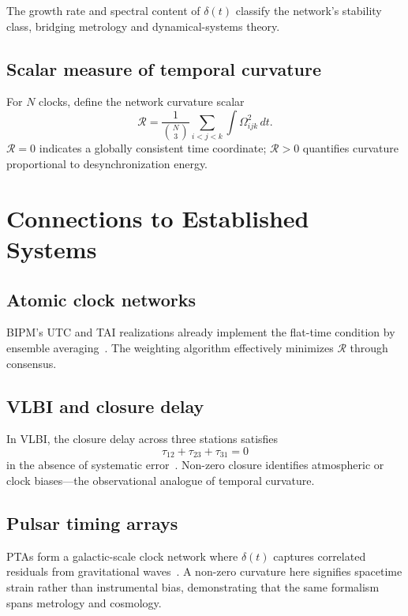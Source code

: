 \documentclass[11pt,a4paper]{article}
\begin{document}
The growth rate and spectral content of $\delta(t)$ classify the network's stability class, bridging metrology and dynamical-systems theory.

\subsection{Scalar measure of temporal curvature}
For $N$ clocks, define the network curvature scalar
\begin{equation}
\mathcal{R} = 
\frac{1}{\binom{N}{3}}
\sum_{i<j<k} 
\int \Omega_{ijk}^2 \, dt.
\end{equation}
$\mathcal{R}=0$ indicates a globally consistent time coordinate; $\mathcal{R}>0$ quantifies curvature proportional to desynchronization energy.

\section{Connections to Established Systems}

\subsection{Atomic clock networks}
BIPM's UTC and TAI realizations already implement the flat-time condition by ensemble averaging~\citep{Petit2014}. 
The weighting algorithm effectively minimizes $\mathcal{R}$ through consensus.

\subsection{VLBI and closure delay}
In VLBI, the closure delay across three stations satisfies
\begin{equation}
\tau_{12} + \tau_{23} + \tau_{31} = 0
\end{equation}
in the absence of systematic error~\citep{Thompson2017}. 
Non-zero closure identifies atmospheric or clock biases—the observational analogue of temporal curvature.

\subsection{Pulsar timing arrays}
PTAs form a galactic-scale clock network where $\delta(t)$ captures correlated residuals from gravitational waves~\citep{Detweiler1979,NANOGrav2023}. 
A non-zero curvature here signifies spacetime strain rather than instrumental bias, demonstrating that the same formalism spans metrology and cosmology.
\end{document}
